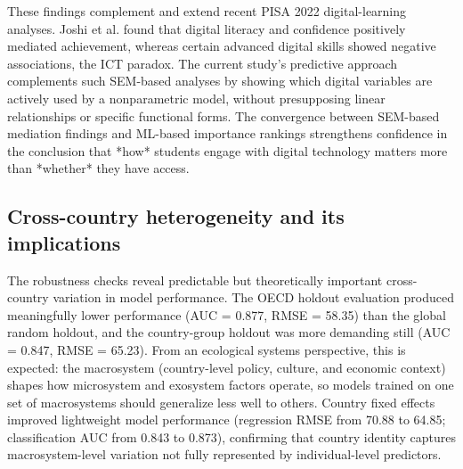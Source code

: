 \documentclass[pdflatex,sn-mathphys-ay]{sn-jnl}
\begin{document}
These findings complement and extend recent PISA 2022 digital-learning analyses. Joshi et al. \citep{Joshi_2025_digital_literacy} found that digital literacy and confidence positively mediated achievement, whereas certain advanced digital skills showed negative associations, the ICT paradox. The current study's predictive approach complements such SEM-based analyses by showing which digital variables are actively used by a nonparametric model, without presupposing linear relationships or specific functional forms. The convergence between SEM-based mediation findings and ML-based importance rankings strengthens confidence in the conclusion that *how* students engage with digital technology matters more than *whether* they have access.

\subsection{Cross-country heterogeneity and its implications}

The robustness checks reveal predictable but theoretically important cross-country variation in model performance. The OECD holdout evaluation produced meaningfully lower performance (AUC = 0.877, RMSE = 58.35) than the global random holdout, and the country-group holdout was more demanding still (AUC = 0.847, RMSE = 65.23). From an ecological systems perspective, this is expected: the macrosystem (country-level policy, culture, and economic context) shapes how microsystem and exosystem factors operate, so models trained on one set of macrosystems should generalize less well to others. Country fixed effects improved lightweight model performance (regression RMSE from 70.88 to 64.85; classification AUC from 0.843 to 0.873), confirming that country identity captures macrosystem-level variation not fully represented by individual-level predictors.
\end{document}
